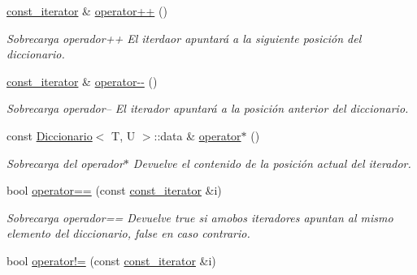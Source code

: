 \begin{DoxyCompactItemize}
\item 
\mbox{\label{classDiccionario_1_1const__iterator_adaea80a81bf9003b8a24d86a4242228f}} 
\hyperlink{classDiccionario_1_1const__iterator}{const\+\_\+iterator} \& \hyperlink{classDiccionario_1_1const__iterator_adaea80a81bf9003b8a24d86a4242228f}{operator++} ()
\begin{DoxyCompactList}\small\item\em Sobrecarga operador++ El iterdaor apuntará a la siguiente posición del diccionario. \end{DoxyCompactList}\item 
\mbox{\label{classDiccionario_1_1const__iterator_a2df15fadfb78a83b8ef68d87c4f0b205}} 
\hyperlink{classDiccionario_1_1const__iterator}{const\+\_\+iterator} \& \hyperlink{classDiccionario_1_1const__iterator_a2df15fadfb78a83b8ef68d87c4f0b205}{operator-\/-\/} ()
\begin{DoxyCompactList}\small\item\em Sobrecarga operador-- El iterador apuntará a la posición anterior del diccionario. \end{DoxyCompactList}\item 
\mbox{\label{classDiccionario_1_1const__iterator_a6dcdc94964a105a17222c22cdf3ab132}} 
const \hyperlink{classDiccionario}{Diccionario}$<$ T, U $>$\+::data \& \hyperlink{classDiccionario_1_1const__iterator_a6dcdc94964a105a17222c22cdf3ab132}{operator$\ast$} ()
\begin{DoxyCompactList}\small\item\em Sobrecarga del operador$\ast$ Devuelve el contenido de la posición actual del iterador. \end{DoxyCompactList}\item 
bool \hyperlink{classDiccionario_1_1const__iterator_ad555aa24c339252bb623f04054893a51}{operator==} (const \hyperlink{classDiccionario_1_1const__iterator}{const\+\_\+iterator} \&i)
\begin{DoxyCompactList}\small\item\em Sobrecarga operador== Devuelve true si amobos iteradores apuntan al mismo elemento del diccionario, false en caso contrario. \end{DoxyCompactList}\item 
bool \hyperlink{classDiccionario_1_1const__iterator_a5239fb7bff61e8ffb771355f18ea03a9}{operator!=} (const \hyperlink{classDiccionario_1_1const__iterator}{const\+\_\+iterator} \&i)

\end{DoxyCompactItemize}
